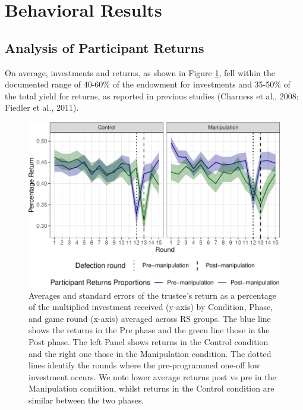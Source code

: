 \documentclass[
]{article}
\begin{document}
\section{Behavioral Results}\label{behavioral-results}

\subsection{Analysis of Participant Returns}\label{analysis-of-participant-returns}

On average, investments and returns, as shown in Figure
\ref{fig:gamesPlot}, fell within the documented range of 40-60\% of the
endowment for investments and 35-50\% of the total yield for returns, as
reported in previous studies (Charness et al., 2008; Fiedler et al., 2011).

\begin{figure}

{\centering \includegraphics[width=\textwidth]{article_files/figure-latex/gamesPlot-1} 

}

\caption{Averages and standard errors of the trustee's return as a percentage of the multiplied investment received (y-axis) by Condition, Phase, and game round (x-axis) averaged across RS groups. The blue line shows the returns in the Pre phase and the green line those in the Post phase. The left Panel shows returns in the Control condition and the right one those in the Manipulation condition. The dotted lines identify the rounds where the pre-programmed one-off low investment occurs. We note lower average returns post vs pre in the Manipulation condition, whilst returns in the Control condition are similar between the two phases.}\label{fig:gamesPlot}
\end{figure}
\end{document}
